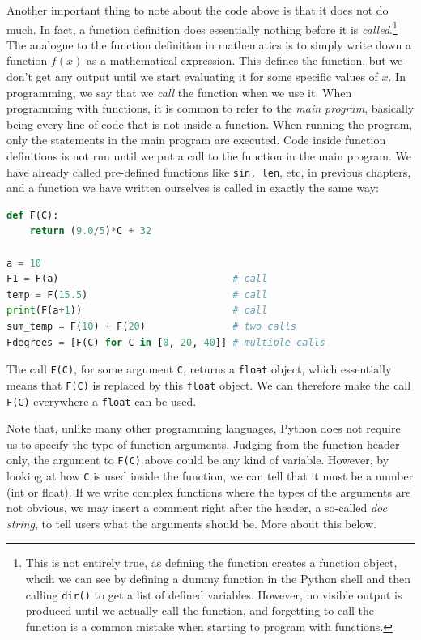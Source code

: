 \documentclass[graybox,envcountchap,sectrefs,final]{svmonodo}
\begin{document}
Another important thing to note about the code above is that it does not do much. In fact, a function definition does
essentially nothing before it is \emph{called}.\footnote{This is not entirely true, as defining the function creates a function object, whcih we can see by defining a dummy function in the Python shell and then calling \texttt{dir()} to get a list of defined variables. However, no visible output is produced until we actually call the function, and forgetting to call the function is a common mistake when starting to program with functions.} The analogue to the function definition
in mathematics is to simply write down a function $f(x)$ as a mathematical expression. This defines the function,
but we don't get any output until we start evaluating it for some specific values of $x$. In programming, we say that we
\emph{call} the function when we use it. When programming with functions, it is common to refer to the \emph{main program}, basically being
every line of code that is not inside a function. When running the program, only the statements in the main
program are executed. Code inside function definitions is not run until we put a call to the function
in the main program. We have already called pre-defined functions like \texttt{sin, len}, etc, in previous
chapters, and a function we have written ourselves is called in exactly the same way:
\begin{lstlisting}[language=Python,style=blue1bar]
def F(C):
    return (9.0/5)*C + 32

a = 10
F1 = F(a)                              # call
temp = F(15.5)                         # call
print(F(a+1))                          # call
sum_temp = F(10) + F(20)               # two calls
Fdegrees = [F(C) for C in [0, 20, 40]] # multiple calls
\end{lstlisting}
The call \texttt{F(C)}, for some argument \texttt{C}, returns a \texttt{float} object, which essentially means that \texttt{F(C)} is
replaced by this \texttt{float} object. We can therefore make the call \texttt{F(C)} everywhere a \texttt{float} can be used.

Note that,
unlike many other programming languages, Python does not require us to specify the type of function arguments. Judging
from the function header only, the argument to \texttt{F(C)} above could be any kind of variable. However, by looking at
how \texttt{C} is used inside the function, we can tell that it must be a number (int or float).
If we write complex functions where the types of the
arguments are not obvious, we may insert a comment right after the header, a so-called \emph{doc string},
to tell users what the arguments should be. More about this below.
\end{document}

